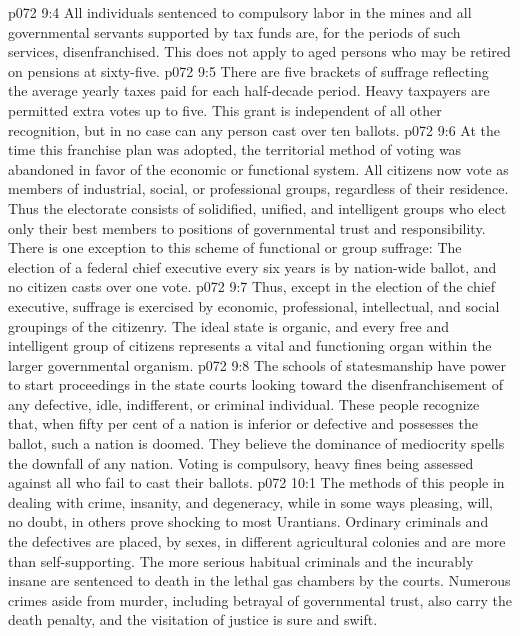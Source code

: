 \pc \vs p072 9:4 \bibnobreakspace All individuals sentenced to compulsory labor in the mines and all governmental servants supported by tax funds are, for the periods of such services, disenfranchised. This does not apply to aged persons who may be retired on pensions at sixty\hyp{}five.
\pc \vs p072 9:5 \bibnobreakspace There are five brackets of suffrage reflecting the average yearly taxes paid for each half\hyp{}decade period. Heavy taxpayers are permitted extra votes up to five. This grant is independent of all other recognition, but in no case can any person cast over ten ballots.
\pc \vs p072 9:6 \bibnobreakspace At the time this franchise plan was adopted, the territorial method of voting was abandoned in favor of the economic or functional system. All citizens now vote as members of industrial, social, or professional groups, regardless of their residence. Thus the electorate consists of solidified, unified, and intelligent groups who elect only their best members to positions of governmental trust and responsibility. There is one exception to this scheme of functional or group suffrage: The election of a federal chief executive every six years is by nation\hyp{}wide ballot, and no citizen casts over one vote.
\pc \vs p072 9:7 Thus, except in the election of the chief executive, suffrage is exercised by economic, professional, intellectual, and social groupings of the citizenry. The ideal state is organic, and every free and intelligent group of citizens represents a vital and functioning organ within the larger governmental organism.
\vs p072 9:8 The schools of statesmanship have power to start proceedings in the state courts looking toward the disenfranchisement of any defective, idle, indifferent, or criminal individual. These people recognize that, when fifty per cent of a nation is inferior or defective and possesses the ballot, such a nation is doomed. They believe the dominance of mediocrity spells the downfall of any nation. Voting is compulsory, heavy fines being assessed against all who fail to cast their ballots.
\vs p072 10:1 The methods of this people in dealing with crime, insanity, and degeneracy, while in some ways pleasing, will, no doubt, in others prove shocking to most Urantians. Ordinary criminals and the defectives are placed, by sexes, in different agricultural colonies and are more than self\hyp{}supporting. The more serious habitual criminals and the incurably insane are sentenced to death in the lethal gas chambers by the courts. Numerous crimes aside from murder, including betrayal of governmental trust, also carry the death penalty, and the visitation of justice is sure and swift.\plusone
